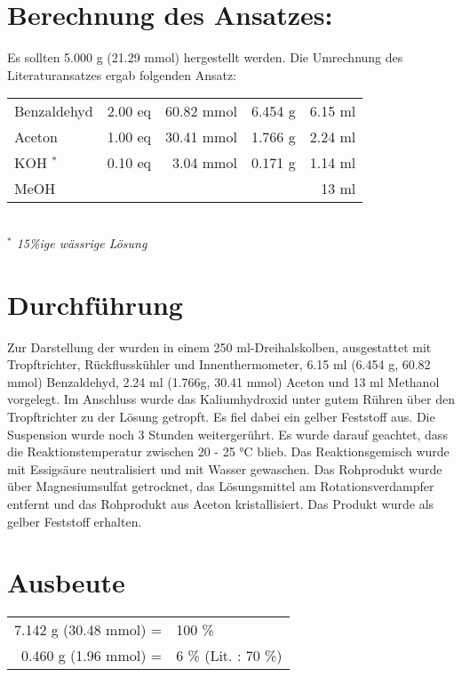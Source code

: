 \documentclass[12pt]{article}
\begin{document}
\begin{onehalfspace}
\section{Berechnung des Ansatzes: } 
Es sollten 5.000 g (21.29 mmol)  hergestellt werden. Die Umrechnung des Literaturansatzes \cite{organikum} ergab folgenden Ansatz:\\[0.5cm]
\begin{tabular}{lrrrr}
Benzaldehyd & 2.00 eq  & 60.82 mmol & 6.454 g & 6.15 ml\\
Aceton  & 1.00 eq  & 30.41 mmol &  1.766 g & 2.24 ml\\
KOH $^\ast$ & 0.10 eq  & 3.04 mmol & 0.171 g & 1.14 ml\\
MeOH &   & &  & 13 ml\\
\end{tabular}\\
\footnotesize \textit{$^\ast$ 15\%ige wässrige Lösung} 
\normalsize \section{Durchführung \cite{organikum}} 
Zur Darstellung der  wurden in einem 250 ml-Dreihalskolben, ausgestattet mit Tropftrichter, Rückflusskühler und Innenthermometer, 6.15 ml (6.454 g, 60.82 mmol) Benzaldehyd, 2.24 ml (1.766g, 30.41 mmol) Aceton und 13 ml Methanol vorgelegt. Im Anschluss wurde das Kaliumhydroxid unter gutem Rühren über den Tropftrichter zu der Lösung getropft. Es fiel dabei ein gelber Feststoff aus. Die Suspension wurde noch 3 Stunden weitergerührt. Es wurde darauf geachtet, dass die Reaktionstemperatur zwischen 20 - 25 \si{\celsius} blieb. Das Reaktionsgemisch wurde mit Essigsäure neutralisiert und mit Wasser gewaschen. Das Rohprodukt wurde über Magnesiumsulfat getrocknet, das Lösungsmittel am Rotationsverdampfer entfernt und das Rohprodukt aus Aceton kristallisiert. Das Produkt wurde als gelber Feststoff erhalten.
\section{Ausbeute} 
\begin{tabular}{ rl}
  7.142 g (30.48 mmol) =  & 100 \%\\
  0.460 g (1.96 mmol) =  & 6 \% (Lit.\cite{organikum} : 70 \%) \\
 \end{tabular}

\end{onehalfspace}
\end{document}
